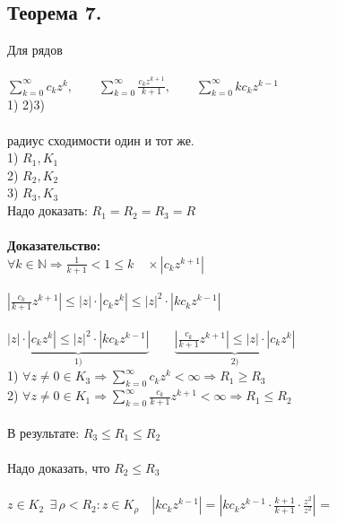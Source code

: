 \documentclass[a4paper,12pt]{article} %
\begin{document}
  \subsection*{Теорема 7.}
  \noindent Для рядов \\
  \ \\
  $\sum\limits_{k = 0}^\infty c_k z^k, \quad \quad \sum\limits_{k = 0}^\infty \frac{c_k z^{k + 1}}{k + 1}, \quad \quad \sum\limits_{k = 0}^\infty k c_k z^{k - 1} \quad$ \\
   \hspace*{0.5 cm}1) \hspace*{2.4 cm}2)\hspace*{2.7 cm}3)\\
   \ \\
    радиус сходимости один и тот же.\\
    1) $R_1, K_1$\\
    2) $R_2, K_2$\\
    3) $R_3, K_3$\\
    Надо доказать: $R_1 = R_2 = R_3 = R$\\
\ \\
    \noindent\textbf{Доказательство:}\\
    $\forall k \in \mathbb{N} \Rightarrow \frac{1}{k + 1} < 1 \leqslant k \quad  \times |c_k z^{k + 1}|$\\
    \ \\
    $|\frac{c_k}{k + 1} z^{k + 1}| \leqslant |z| \cdot |c_k z^k| \leqslant |z|^2 \cdot |k c_k z^{k - 1}|$\\
    \ \\
    $\underbrace{ |z| \cdot |c_k z^k| \leqslant |z|^2 \cdot |k c_k z^{k - 1}|}_{1)} \quad \quad \underbrace{|\frac{c_k}{k + 1} z^{k + 1}| \leqslant |z| \cdot |c_k z^k|}_{2)}$\\
    1) $\forall z \neq 0 \in K_3 \Rightarrow \sum\limits_{k = 0}^\infty c_k z^k < \infty \Rightarrow R_1 \geqslant R_3$\\
    2) $\forall z \neq 0 \in K_1 \Rightarrow \sum\limits_{k = 0}^\infty \frac{c_k}{k + 1} z^{k+1} < \infty \Rightarrow R_1 \leqslant R_2$\\
    \ \\
    В результате: $R_3 \leqslant R_1 \leqslant R_2 $\\
    \ \\
    Надо доказать, что $R_2 \leqslant R_3$\\
    \ \\
    $z \in K_2 \ \  \exists \, \rho < R_2: z \in K_{\rho} \quad |k c_k z^{k - 1}| = |k c_k z^{k - 1} \cdot \frac{k + 1}{k + 1} \cdot \frac{z^2}{z^2}|$ = \\
\end{document}
